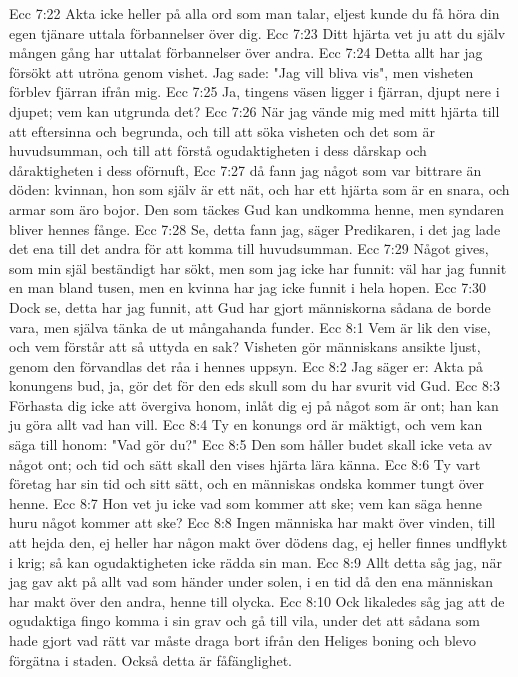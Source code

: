Ecc 7:22  Akta icke heller på alla ord som man talar, eljest kunde du få höra din egen tjänare uttala förbannelser över dig.
Ecc 7:23  Ditt hjärta vet ju att du själv mången gång har uttalat förbannelser över andra.
Ecc 7:24  Detta allt har jag försökt att utröna genom vishet. Jag sade: "Jag vill bliva vis", men visheten förblev fjärran ifrån mig.
Ecc 7:25  Ja, tingens väsen ligger i fjärran, djupt nere i djupet; vem kan utgrunda det?
Ecc 7:26  När jag vände mig med mitt hjärta till att eftersinna och begrunda, och till att söka visheten och det som är huvudsumman, och till att förstå ogudaktigheten i dess dårskap och dåraktigheten i dess oförnuft,
Ecc 7:27  då fann jag något som var bittrare än döden: kvinnan, hon som själv är ett nät, och har ett hjärta som är en snara, och armar som äro bojor. Den som täckes Gud kan undkomma henne, men syndaren bliver hennes fånge.
Ecc 7:28  Se, detta fann jag, säger Predikaren, i det jag lade det ena till det andra för att komma till huvudsumman.
Ecc 7:29  Något gives, som min själ beständigt har sökt, men som jag icke har funnit: väl har jag funnit en man bland tusen, men en kvinna har jag icke funnit i hela hopen.
Ecc 7:30  Dock se, detta har jag funnit, att Gud har gjort människorna sådana de borde vara, men själva tänka de ut mångahanda funder.
Ecc 8:1  Vem är lik den vise, och vem förstår att så uttyda en sak? Visheten gör människans ansikte ljust, genom den förvandlas det råa i hennes uppsyn.
Ecc 8:2  Jag säger er: Akta på konungens bud, ja, gör det för den eds skull som du har svurit vid Gud.
Ecc 8:3  Förhasta dig icke att övergiva honom, inlåt dig ej på något som är ont; han kan ju göra allt vad han vill.
Ecc 8:4  Ty en konungs ord är mäktigt, och vem kan säga till honom: "Vad gör du?"
Ecc 8:5  Den som håller budet skall icke veta av något ont; och tid och sätt skall den vises hjärta lära känna.
Ecc 8:6  Ty vart företag har sin tid och sitt sätt, och en människas ondska kommer tungt över henne.
Ecc 8:7  Hon vet ju icke vad som kommer att ske; vem kan säga henne huru något kommer att ske?
Ecc 8:8  Ingen människa har makt över vinden, till att hejda den, ej heller har någon makt över dödens dag, ej heller finnes undflykt i krig; så kan ogudaktigheten icke rädda sin man.
Ecc 8:9  Allt detta såg jag, när jag gav akt på allt vad som händer under solen, i en tid då den ena människan har makt över den andra, henne till olycka.
Ecc 8:10  Ock likaledes såg jag att de ogudaktiga fingo komma i sin grav och gå till vila, under det att sådana som hade gjort vad rätt var måste draga bort ifrån den Heliges boning och blevo förgätna i staden. Också detta är fåfänglighet.
